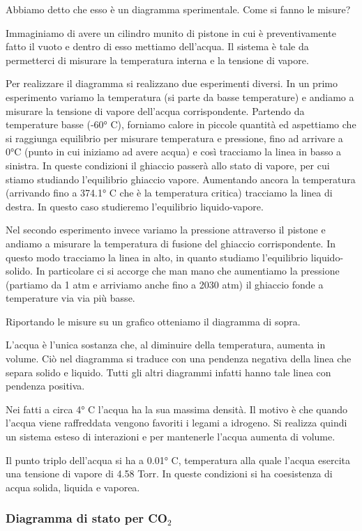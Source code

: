 Abbiamo detto che esso è un diagramma sperimentale. Come si fanno le misure?

Immaginiamo di avere un cilindro munito di pistone in cui è preventivamente fatto il vuoto e dentro di esso mettiamo dell'acqua. Il sistema è tale da permetterci di misurare la temperatura interna e la tensione di vapore.

Per realizzare il diagramma si realizzano due esperimenti diversi. In un primo esperimento variamo la temperatura (si parte da basse temperature) e andiamo a misurare la tensione di vapore dell'acqua corrispondente. Partendo da temperature basse (-60° C), forniamo calore in piccole quantità ed aspettiamo che si raggiunga equilibrio per misurare temperatura e pressione, fino ad arrivare a 0°C (punto in cui iniziamo ad avere acqua) e così tracciamo la linea in basso a sinistra. In queste condizioni il ghiaccio passerà allo stato di vapore, per cui stiamo studiando l'equilibrio ghiaccio vapore. Aumentando ancora la temperatura (arrivando fino a 374.1° C che è la temperatura critica) tracciamo la linea di destra. In questo caso studieremo l'equilibrio liquido-vapore.

Nel secondo esperimento invece variamo la pressione attraverso il pistone e andiamo a misurare la temperatura di fusione del ghiaccio corrispondente. In questo modo tracciamo la linea in alto, in quanto studiamo l'equilibrio liquido-solido. In particolare ci si accorge che man mano che aumentiamo la pressione (partiamo da 1 atm e arriviamo anche fino a 2030 atm) il ghiaccio fonde a temperature via via più basse.

Riportando le misure su un grafico otteniamo il diagramma di sopra.

L'acqua è l'unica sostanza che, al diminuire della temperatura, aumenta in volume. Ciò nel diagramma si traduce con una pendenza negativa della linea che separa solido e liquido. Tutti gli altri diagrammi infatti hanno tale linea con pendenza positiva.

Nei fatti a circa 4° C l'acqua ha la sua massima densità. Il motivo è che quando l'acqua viene raffreddata vengono favoriti i legami a idrogeno. Si realizza quindi un sistema esteso di interazioni e per mantenerle l'acqua aumenta di volume.

Il punto triplo dell'acqua si ha a 0.01° C, temperatura alla quale l'acqua esercita una tensione di vapore di 4.58 Torr. In queste condizioni si ha coesistenza di acqua solida, liquida e vaporea. 
\subsubsection{Diagramma di stato per CO$_2$}

